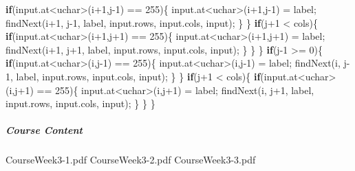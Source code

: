 \documentclass[]{article}
\newenvironment{Shaded}{\begin{snugshade}}{\end{snugshade}}
\newcommand{\KeywordTok}[1]{\textcolor[rgb]{0.13,0.29,0.53}{\textbf{{#1}}}}
\newcommand{\DataTypeTok}[1]{\textcolor[rgb]{0.13,0.29,0.53}{{#1}}}
\newcommand{\DecValTok}[1]{\textcolor[rgb]{0.00,0.00,0.81}{{#1}}}
\newcommand{\NormalTok}[1]{{#1}}
\let\oldsubparagraph\subparagraph
\renewcommand{\subparagraph}[1]{\oldsubparagraph{#1}\mbox{}}
\begin{document}
\begin{Shaded}
\begin{Highlighting}[]
            \KeywordTok{if}\NormalTok{(input.at<}\DataTypeTok{uchar}\NormalTok{>(i}\DecValTok{+1}\NormalTok{,j}\DecValTok{-1}\NormalTok{) == }\DecValTok{255}\NormalTok{)\{}
                \NormalTok{input.at<}\DataTypeTok{uchar}\NormalTok{>(i}\DecValTok{+1}\NormalTok{,j}\DecValTok{-1}\NormalTok{) = label;}
                \NormalTok{findNext(i}\DecValTok{+1}\NormalTok{, j}\DecValTok{-1}\NormalTok{, label, input.rows, input.cols, input);}
            \NormalTok{\}}
        \NormalTok{\}}
        \KeywordTok{if}\NormalTok{(j}\DecValTok{+1} \NormalTok{< cols)\{}
            \KeywordTok{if}\NormalTok{(input.at<}\DataTypeTok{uchar}\NormalTok{>(i}\DecValTok{+1}\NormalTok{,j}\DecValTok{+1}\NormalTok{) == }\DecValTok{255}\NormalTok{)\{}
                \NormalTok{input.at<}\DataTypeTok{uchar}\NormalTok{>(i}\DecValTok{+1}\NormalTok{,j}\DecValTok{+1}\NormalTok{) = label;}
                \NormalTok{findNext(i}\DecValTok{+1}\NormalTok{, j}\DecValTok{+1}\NormalTok{, label, input.rows, input.cols, input);}
            \NormalTok{\}}
        \NormalTok{\}}
    \NormalTok{\}}
    \KeywordTok{if}\NormalTok{(j}\DecValTok{-1} \NormalTok{>= }\DecValTok{0}\NormalTok{)\{}
        \KeywordTok{if}\NormalTok{(input.at<}\DataTypeTok{uchar}\NormalTok{>(i,j}\DecValTok{-1}\NormalTok{) == }\DecValTok{255}\NormalTok{)\{}
            \NormalTok{input.at<}\DataTypeTok{uchar}\NormalTok{>(i,j}\DecValTok{-1}\NormalTok{) = label;}
            \NormalTok{findNext(i, j}\DecValTok{-1}\NormalTok{, label, input.rows, input.cols, input);}
        \NormalTok{\}}
    \NormalTok{\}}
    \KeywordTok{if}\NormalTok{(j}\DecValTok{+1} \NormalTok{< cols)\{}
        \KeywordTok{if}\NormalTok{(input.at<}\DataTypeTok{uchar}\NormalTok{>(i,j}\DecValTok{+1}\NormalTok{) == }\DecValTok{255}\NormalTok{)\{}
            \NormalTok{input.at<}\DataTypeTok{uchar}\NormalTok{>(i,j}\DecValTok{+1}\NormalTok{) = label;}
            \NormalTok{findNext(i, j}\DecValTok{+1}\NormalTok{, label, input.rows, input.cols, input);}
        \NormalTok{\}}
    \NormalTok{\}}
\NormalTok{\}}
\end{Highlighting}
\end{Shaded}

\subparagraph{Course Content}\label{course-content-2}

CourseWeek3-1.pdf CourseWeek3-2.pdf CourseWeek3-3.pdf
\end{document}
